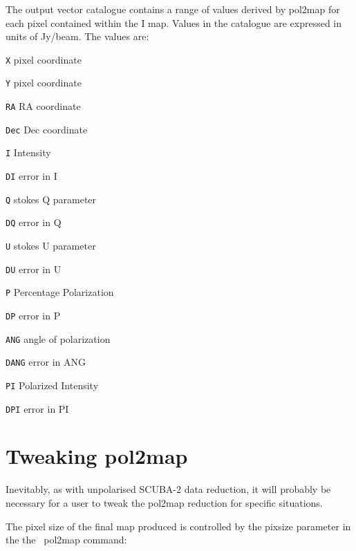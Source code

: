 The output vector catalogue contains a range of values derived by pol2map for each pixel
contained within the I map. Values in the catalogue are expressed in units of Jy/beam.
The values are:

\begin{aligndesc}
\item[\texttt{X}] pixel coordinate
\item[\texttt{Y}] pixel coordinate
\item[\texttt{RA}] RA coordinate
\item[\texttt{Dec}] Dec coordinate
\item[\texttt{I}] Intensity
\item[\texttt{DI}] error in I
\item[\texttt{Q}] stokes Q parameter
\item[\texttt{DQ}] error in Q
\item[\texttt{U}] stokes U parameter
\item[\texttt{DU}] error in U
\item[\texttt{P}] Percentage Polarization
\item[\texttt{DP}] error in P
\item[\texttt{ANG}] angle of polarization
\item[\texttt{DANG}] error in ANG
\item[\texttt{PI}] Polarized Intensity
\item[\texttt{DPI}] error in PI
\end{aligndesc}




\section{Tweaking pol2map}
\label{sec:pol2map-tweaks}

Inevitably, as with unpolarised SCUBA-2 data reduction, it will probably be necessary for a user to
tweak the pol2map reduction for specific situations.

The pixel size of the final map produced is controlled by the pixsize
parameter in the the \smurf\ pol2map command:

\begin{terminalv}
\end{terminalv}








